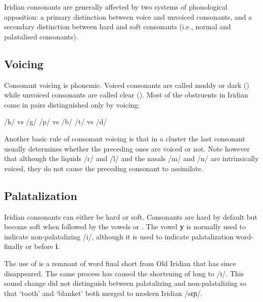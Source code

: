 Iridian consonants are generally affected by two systems of phonological
opposition: a primary distinction between voice and unvoiced consonants, and a
secondary distinction between hard and soft consonants (i.e., normal and
palatalised consonants).

\subsection{Voicing}
Consonant voicing is phonemic. Voiced consonants are called muddy or dark
() while unvoiced consonants are called clear ().
Most of the obstruents in Iridian come in pairs distinguished only by voicing:

\pex
\a /k/  vs /g/ 
\a /p/  vs /b/ 
\a /t/  vs /d/ 
\xe

Another basic rule of consonant voicing is that in a cluster the last consonant
usually determines whether the preceding ones are voiced or not. Note however that although the liquids /r/ and /l/ and the nasals
/m/ and /n/ are intrinsically voiced, they do not cause the preceding consonant
to assimilate.

\pex
\a{} \a{}
\a{} \a{}
\xe



\subsection{Palatalization}
\par Iridian consonants can either be hard or soft. Consonants are hard by
default but become soft when followed by the vowels  or . The
vowel \textbf{y} is normally used to indicate non-palatalizing /i/, although it
is used to indicate palatalization word-finally or before \textbf{i}.

\par The use of  is a remnant of word final short  from Old
Iridian that has since disappeared. The same process has caused the shortening
of long  to /ɪ/. This sound change did not distinguish between
palatalizing and non-palatalizing  so that  `tooth' and
 `blanket' both merged to modern Iridian  /sɛɲ/.

